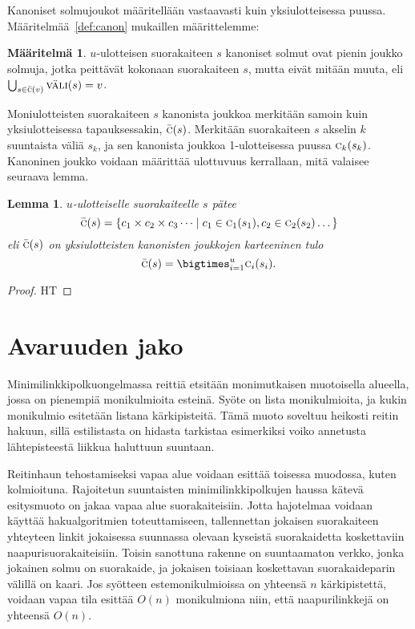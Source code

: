 \documentclass[finnish]{tktltiki2}
\newtheorem{lem}[lau]{Lemma}
\theoremstyle{definition}
\newtheorem{maar}[lau]{Määritelmä}
\theoremstyle{remark}
\newcommand\set[1]{\ensuremath{\left\{#1\right\}}\xspace}
\newcommand\size[1]{\ensuremath{\left |#1\right |}\xspace}
\newcommand\epts{\ensuremath{P}\xspace}
\newcommand\inter[1]{\ensuremath{\textsc{väli}(#1)}\xspace}
\newcommand\canon[1]{\ensuremath{\bar{\textsc{c}}(#1)}\xspace}
\newcommand\canoni[2]{\ensuremath{\textsc{c}_{#2}(#1)}\xspace}
\begin{document}
Kanoniset solmujoukot määritellään vastaavasti kuin yksiulotteisessa puussa.
Määritelmää~\ref{def:canon} mukaillen määrittelemme:
\begin{maar}\label{def:canond}
$u$-ulotteisen suorakaiteen $s$ kanoniset solmut ovat pienin joukko solmuja, jotka peittävät kokonaan suorakaiteen $s$, mutta eivät mitään muuta, eli $\bigcup_{s\in\canon{v}}\inter{s}=v$.
\end{maar}

Moniulotteisten suorakaiteen $s$ kanonista joukkoa merkitään samoin kuin yksiulotteisessa tapauksessakin, $\canon{s}$.
Merkitään suorakaiteen $s$ akselin $k$ suuntaista väliä $s_k$, ja sen kanonista joukkoa 1-ulotteisessa puussa $\canoni{s_k}{k}$.
Kanoninen joukko voidaan määrittää ulottuvuus kerrallaan, mitä valaisee seuraava lemma.

\begin{lem}$u$-ulotteiselle suorakaiteelle $s$ pätee
$$\canon{s}=\set{c_1\times c_2\times c_3\dots \mid c_1\in\canoni{s_1}{1}, c_2\in\canoni{s_2}{2}\dots}$$
eli \canon{s} on yksiulotteisten kanonisten joukkojen karteeninen tulo
$$\canon{s}=\bigtimes_{i=1}^u \canoni{s_i}{i}.$$
\end{lem}
\begin{proof}HT\end{proof}


\section{Avaruuden jako}\label{sec:jako}

Minimilinkkipolkuongelmassa reittiä etsitään monimutkaisen muotoisella alueella, jossa on pienempiä monikulmioita esteinä.
Syöte on lista monikulmioita, ja kukin monikulmio esitetään listana kärkipisteitä.
Tämä muoto soveltuu heikosti reitin hakuun, sillä estilistasta on hidasta tarkistaa esimerkiksi voiko annetusta lähtepisteestä liikkua haluttuun suuntaan.

Reitinhaun tehostamiseksi vapaa alue voidaan esittää toisessa muodossa, kuten kolmioituna.
Rajoitetun suuntaisten minimilinkkipolkujen haussa kätevä esitysmuoto on jakaa vapaa alue suorakaiteisiin.
Jotta hajotelmaa voidaan käyttää hakualgoritmien toteuttamiseen, tallennettan jokaisen suorakaiteen yhteyteen linkit jokaisessa suunnassa olevaan kyseistä suorakaidetta koskettaviin naapurisuorakaiteisiin.
Toisin sanottuna rakenne on suuntaamaton verkko, jonka jokainen solmu on suorakaide, ja jokaisen toisiaan koskettavan suorakaideparin välillä on kaari.
Jos syötteen estemonikulmioissa on yhteensä $n$ kärkipistettä, voidaan vapaa tila esittää $O(n)$ monikulmiona niin, että naapurilinkkejä on yhteensä $O(n)$.
\end{document}
